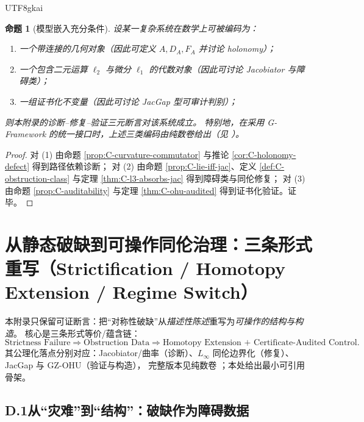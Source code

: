 \documentclass[12pt]{article}
\newtheorem{proposition}{命题}[section]
\begin{document}
\begin{CJK*}{UTF8}{gkai}
\begin{proposition}[模型嵌入充分条件]\label{prop:C-sufficient-embedding}
设某一复杂系统在数学上可被编码为：
\begin{enumerate}
  \item 一个带连接的几何对象（因此可定义 $A,D_A,F_A$ 并讨论 holonomy）；
  \item 一个包含二元运算 $\ell_2$ 与微分 $\ell_1$ 的代数对象（因此可讨论 Jacobiator 与障碍类）；
  \item 一组证书化不变量（因此可讨论 JacGap 型可审计判别）；
\end{enumerate}
则本附录的诊断--修复--验证三元断言对该系统成立。
特别地，在采用 G-Framework 的统一接口时，上述三类编码由纯数卷给出（见 \cite{GaoZheng2025GFramework}）。
\end{proposition}

\begin{proof}
对 (1) 由命题 \ref{prop:C-curvature-commutator} 与推论 \ref{cor:C-holonomy-defect} 得到路径依赖诊断；
对 (2) 由命题 \ref{prop:C-lie-iff-jac}、定义 \ref{def:C-obstruction-class} 与定理 \ref{thm:C-l3-absorbs-jac} 得到障碍类与同伦修复；
对 (3) 由命题 \ref{prop:C-auditability} 与定理 \ref{thm:C-ohu-audited} 得到证书化验证。证毕。
\end{proof}

\clearpage
\clearpage

\section{从静态破缺到可操作同伦治理：三条形式重写（Strictification / Homotopy Extension / Regime Switch）}\label{app:D-algebraic-governance}

本附录只保留可证断言：把“对称性破缺”从\emph{描述性陈述}重写为\emph{可操作的结构与构造}。
核心是三条形式等价/蕴含链：
\[
  \text{Strictness Failure}
  \Longrightarrow
  \text{Obstruction Data}
  \Longrightarrow
  \text{Homotopy Extension + Certificate-Audited Control}.
\]
其公理化落点分别对应：Jacobiator/曲率（诊断）、$L_\infty$ 同伦边界化（修复）、JacGap 与 GZ-OHU（验证与构造），
完整版本见纯数卷 \cite{GaoZheng2025GFramework}；本处给出最小可引用骨架。

\subsection{D.1\;从“灾难”到“结构”：破缺作为障碍数据}


\end{CJK*}
\end{document}
